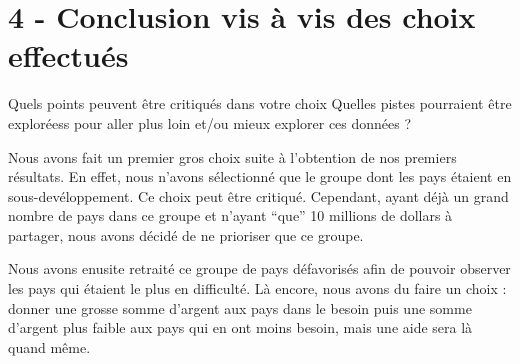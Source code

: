 \documentclass[
]{article}
\begin{document}
\hypertarget{conclusion-vis-uxe0-vis-des-choix-effectuuxe9s}{%
\section{4 - Conclusion vis à vis des choix
effectués}\label{conclusion-vis-uxe0-vis-des-choix-effectuuxe9s}}

Quels points peuvent être critiqués dans votre choix Quelles pistes
pourraient être exploréess pour aller plus loin et/ou mieux explorer ces
données ?

Nous avons fait un premier gros choix suite à l'obtention de nos
premiers résultats. En effet, nous n'avons sélectionné que le groupe
dont les pays étaient en sous-devéloppement. Ce choix peut être
critiqué. Cependant, ayant déjà un grand nombre de pays dans ce groupe
et n'ayant ``que'' 10 millions de dollars à partager, nous avons décidé
de ne prioriser que ce groupe.

Nous avons enusite retraité ce groupe de pays défavorisés afin de
pouvoir observer les pays qui étaient le plus en difficulté. Là encore,
nous avons du faire un choix : donner une grosse somme d'argent aux pays
dans le besoin puis une somme d'argent plus faible aux pays qui en ont
moins besoin, mais une aide sera là quand même.
\end{document}
